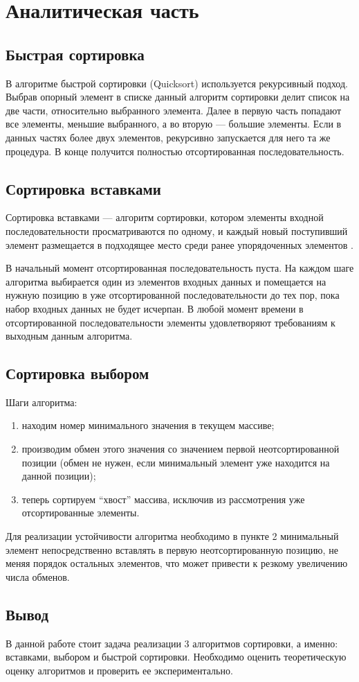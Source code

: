 \chapter{Аналитическая часть}

\section{Быстрая сортировка}

В алгоритме быстрой сортировки (Quicksort) используется рекурсивный подход.
Выбрав опорный элемент в списке данный алгоритм сортировки делит список на две части, относительно выбранного элемента.
Далее в первую часть попадают все элементы, меньшие выбранного, а во вторую — большие элементы. 
Если в данных частях более двух элементов, рекурсивно запускается для него та же процедура. 
В конце получится полностью отсортированная последовательность.

\section{Сортировка вставками}

Сортировка вставками — алгоритм сортировки, котором элементы входной последовательности просматриваются по одному, и каждый новый поступивший элемент размещается в подходящее место среди ранее упорядоченных элементов \cite{Knut}.

В начальный момент отсортированная последовательность пуста.
На каждом шаге алгоритма выбирается один из элементов входных данных и помещается на нужную позицию в уже отсортированной последовательности до тех пор, пока набор входных данных не будет исчерпан.
В любой момент времени в отсортированной последовательности элементы удовлетворяют требованиям к выходным данным алгоритма.

\section{Сортировка выбором}

Шаги алгоритма:
\begin{enumerate}
	\item находим номер минимального значения в текущем массиве;
	\item производим обмен этого значения со значением первой неотсортированной позиции (обмен не нужен, если минимальный элемент уже находится на данной позиции);
	\item теперь сортируем ``хвост'' массива, исключив из рассмотрения уже отсортированные элементы.
\end{enumerate}

Для реализации устойчивости алгоритма необходимо в пункте 2 минимальный элемент непосредственно вставлять в первую неотсортированную позицию, не меняя порядок остальных элементов, что может привести к резкому увеличению числа обменов. 

\section*{Вывод}
В данной работе стоит задача реализации 3 алгоритмов сортировки, а именно: вставками, выбором и быстрой сортировки.
Необходимо оценить теоретическую оценку алгоритмов и проверить ее экспериментально.

